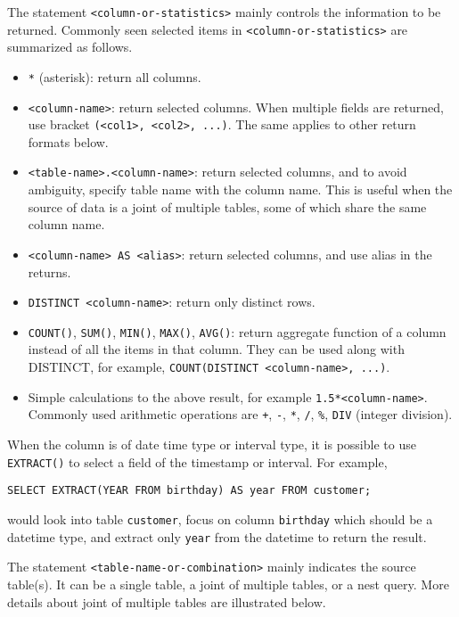 The statement \verb|<column-or-statistics>| mainly controls the information to be returned. Commonly seen selected items in \verb|<column-or-statistics>| are summarized as follows.
\begin{itemize}
  \item \verb|*| (asterisk): return all columns.
  \item \verb|<column-name>|: return selected columns.  When multiple fields are returned, use bracket \verb|(<col1>, <col2>, ...)|. The same applies to other return formats below.
  \item \verb|<table-name>.<column-name>|: return selected columns, and to avoid ambiguity, specify table name with the column name. This is useful when the source of data is a joint of multiple tables, some of which share the same column name.
  \item \verb|<column-name> AS <alias>|: return selected columns, and use alias in the returns.
  \item \verb|DISTINCT <column-name>|: return only distinct rows.
  \item \verb|COUNT()|, \verb|SUM()|, \verb|MIN()|, \verb|MAX()|, \verb|AVG()|: return aggregate function of a column instead of all the items in that column. They can be used along with DISTINCT, for example, \verb|COUNT(DISTINCT <column-name>, ...)|.
  \item Simple calculations to the above result, for example \verb|1.5*<column-name>|. Commonly used arithmetic operations are \verb|+|, \verb|-|, \verb|*|, \verb|/|, \verb|%|, \verb|DIV| (integer division).
\end{itemize}
When the column is of date time type or interval type, it is possible to use \verb|EXTRACT()| to select a field of the timestamp or interval. For example,
\begin{lstlisting}
SELECT EXTRACT(YEAR FROM birthday) AS year FROM customer;
\end{lstlisting}
would look into table \verb|customer|, focus on column \verb|birthday| which should be a datetime type, and extract only \verb|year| from the datetime to return the result.

The statement \verb|<table-name-or-combination>| mainly indicates the source table(s). It can be a single table, a joint of multiple tables, or a nest query. More details about joint of multiple tables are illustrated below.

